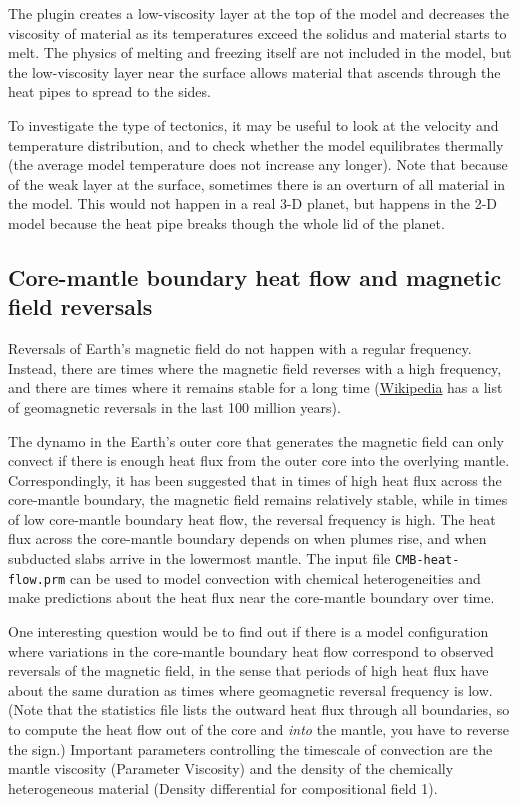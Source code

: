 \documentclass[notitlepage]{article}
\begin{document}
The plugin creates a low-viscosity layer at the top of the model and decreases the viscosity of material
as its temperatures exceed the solidus and material starts to melt. The physics of melting and freezing itself
are not included in the model, but the low-viscosity layer near the surface allows material that ascends through 
the heat pipes to spread to the sides. 

To investigate the type of tectonics, it may be useful to look at the velocity and temperature distribution, 
and to check whether the model equilibrates thermally (the average model temperature does not increase any longer). 
Note that because of the weak layer at the surface, sometimes there is an overturn of all material in the model.
This would not happen in a real 3-D planet, but happens in the 2-D model because the heat pipe breaks though the whole lid 
of the planet. 

\subsection{Core-mantle boundary heat flow and magnetic field reversals}

Reversals of Earth's magnetic field do not happen with a regular frequency. Instead, there are times where 
the magnetic field reverses with a high frequency, and there are times where it remains stable for a long time
(\href{https://en.wikipedia.org/wiki/Geomagnetic_reversal}{Wikipedia} has a list of geomagnetic reversals in
the last 100 million years). 

The dynamo in the Earth's outer core that generates the magnetic field can only convect if there is enough heat
flux from the outer core into the overlying mantle. Correspondingly, it has been suggested that in times of 
high heat flux across the core-mantle boundary, the magnetic field remains relatively stable, while in times 
of low core-mantle boundary heat flow, the reversal frequency is high. 
The heat flux across the core-mantle boundary depends on when plumes rise, and when subducted slabs arrive in
the lowermost mantle. The input file \texttt{CMB-heat-flow.prm} can be used to model convection with chemical
heterogeneities and make predictions about the heat flux near the core-mantle boundary over time. 

One interesting question would be to find out if there is a model configuration where variations in the core-mantle
boundary heat flow correspond to observed reversals of the magnetic field, in the sense that periods of high heat flux
have about the same duration as times where geomagnetic reversal frequency is low. (Note that the statistics file lists
the outward heat flux through all boundaries, so to compute the heat flow out of the core and \textit{into} the mantle, you 
have to reverse the sign.) Important parameters controlling the timescale of convection are the mantle viscosity 
(Parameter Viscosity) and the density of the chemically heterogeneous material (Density differential for compositional field 1). 
\end{document}
